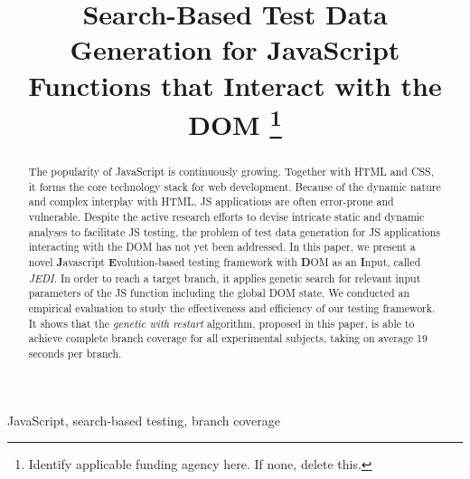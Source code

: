 \documentclass[conference]{IEEEtran}
\begin{document}
\title{Search-Based Test Data Generation for JavaScript Functions that Interact with the DOM
\thanks{Identify applicable funding agency here. If none, delete this.}
}

\author{
\and
{}
\and
{}
}

\maketitle

\begin{abstract}
The popularity of JavaScript is continuously growing. Together with HTML and CSS, it forms the core technology stack for web development. Because of the dynamic nature and complex interplay with HTML, JS applications are often error-prone and vulnerable. Despite the active research efforts to devise intricate static and dynamic analyses to facilitate JS testing, the problem of test data generation for JS applications interacting with the DOM has not yet been addressed. In this paper, we present a novel \textbf{J}avascript \textbf{E}volution-based testing framework with \textbf{D}OM as an \textbf{I}nput, called \emph{JEDI}. In order to reach a target branch, it applies genetic search for relevant input parameters of the JS function including the global DOM state. We conducted an empirical evaluation to study the effectiveness and efficiency of our testing framework. It shows that the \emph{genetic with restart} algorithm, proposed in this paper, is able to achieve complete branch coverage for all experimental subjects, taking on average 19 seconds per branch.
\end{abstract}

\begin{IEEEkeywords}
JavaScript, search-based testing, branch coverage
\end{IEEEkeywords}









 
\end{document}
